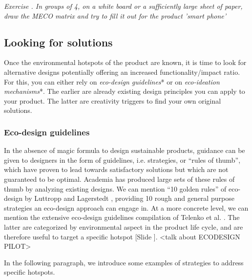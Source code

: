 \documentclass{article}
\newcounter{slide}
\newcounter{exercise}
\begin{document}
\setlength{\parskip}{1em}
{\color{PineGreen}\emph{Exercise . In groups of 4, on a white board or a sufficiently large sheet of paper, draw the MECO matrix and try to fill it out for the product 'smart phone'}}
\setlength{\parskip}{0em}


\subsection{Looking for solutions}
\label{sec:solutions}
Once the environmental hotspots of the product are known, it is time to look for alternative designs potentially offering an increased functionality/impact ratio. For this, you can either rely on \emph{eco-design guidelines}* or on \emph{eco-ideation mechanisms}*. The earlier are already existing design principles you can apply to your product. The latter are creativity triggers to find your own original solutions. 

\subsubsection{Eco-design guidelines}
\label{sec:guidelines}
In the absence of magic formula to design sustainable products, guidance can be given to designers in the form of guidelines, i.e. strategies, or ``rules of thumb'', which have proven to lead towards satisfactory solutions but which are not guaranteed to be optimal. Academia has produced large sets of these rules of thumb by analyzing existing designs. We can mention ``10 golden rules'' of eco-design by Luttropp and Lagerstedt \cite{luttroppEcoDesignTenGolden2006a}, providing 10 rough and general purpose strategies an eco-design approach can engage in. At a more concrete level, we can mention the extensive eco-design guidelines compilation of Telenko et al. \cite{telenkoCompilationDesignEnvironment2016a}. The latter are categorized by environmental aspect in the product life cycle, and are therefore useful to target a specific hotspot {\color{blue}[Slide ]}. {\color{red}\textless talk about ECODESIGN PILOT\textgreater}

In the following paragraph, we introduce some examples of strategies to address specific hotspots.
\end{document}
